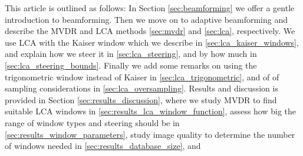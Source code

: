 \documentclass[10pt,journal,draftclsnofoot,onecolumn]{IEEEtran}
\newcommand\1{\vec 1}
\begin{document}
This article is outlined as follows: In Section \ref{sec:beamforming} we offer a gentle introduction to beamforming. Then we move on to adaptive beamforming and describe the MVDR and LCA methods \ref{sec:mvdr} and \ref{sec:lca}, respectively. We use LCA with the Kaiser window which we describe in \ref{sec:lca_kaiser_windows}, and explain how we steer it in \ref{sec:lca_steering}, and by how much in \ref{sec:lca_steering_bounds}. Finally we add some remarks on using the trigonometric window instead of Kaiser in \ref{sec:lca_trigonometric}, and of of sampling considerations in \ref{sec:lca_oversampling}. Results and discussion is provided in Section \ref{sec:results_discussion}, where we study MVDR to find suitable LCA windows in \ref{sec:results_lca_window_function}, assess how big the range of window types and steering should be in \ref{sec:results_window_parameters}, study image quality to determine the number of windows needed in \ref{sec:results_database_size}, and 


% 
% 
% 
% 
% 
% 
\end{document}
